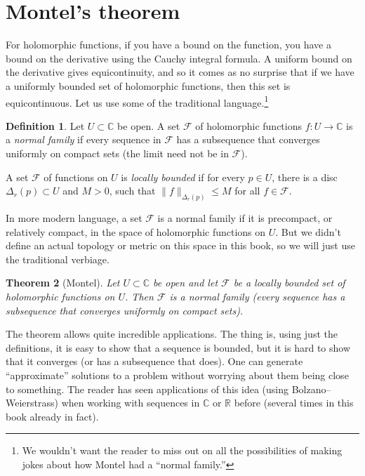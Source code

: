 \documentclass[12pt,openany]{book}
\newcommand{\snorm}[1]{\lVert {#1} \rVert}
\newcommand{\C}{{\mathbb{C}}}
\newcommand{\R}{{\mathbb{R}}}
\newcommand{\sF}{{\mathscr{F}}}
\newcommand{\myindex}[1]{#1\index{#1}}
\newcommand{\myquote}[1]{``#1''}
\theoremstyle{plain}
\newtheorem{thm}{Theorem}[section]
\theoremstyle{remark}
\theoremstyle{definition}
\newtheorem{defn}[thm]{Definition}
\theoremstyle{exercise}
\theoremstyle{example}
\begin{document}

\section{Montel's theorem}
\label{sec:montel}

For holomorphic functions, if you have a bound on the function, you have a
bound on the derivative using the Cauchy integral formula.  A uniform
bound on the derivative gives equicontinuity, and
so it comes as no
surprise that if we have a uniformly bounded set of holomorphic functions,
then this set is equicontinuous.
Let us use some of the traditional language.\footnote{%
We wouldn't want the reader to miss out on all the possibilities of making
jokes about how Montel had a \myquote{normal family.}}

\begin{defn}
Let $U \subset \C$ be open.
A set $\sF$ of holomorphic functions $f \colon U \to \C$ is a
\emph{\myindex{normal family}} if every sequence in $\sF$ has a subsequence
that converges uniformly on compact sets (the limit need not be in $\sF$).

A set $\sF$ of functions on $U$ is \emph{\myindex{locally bounded}}
if for every $p \in U$, there is a disc $\Delta_r(p) \subset U$ and $M > 0$,
such that 
$\snorm{f}_{\Delta_r(p)} \leq M$ for all $f \in \sF$.
\end{defn}

In more modern language, a set $\sF$ is a normal family if it is precompact, or
relatively compact, in the space of holomorphic functions on $U$.  But we
didn't define an actual topology or metric on this space in this book, so
we will just use the traditional verbiage.

\begin{thm}[Montel]
Let $U \subset \C$ be open and let $\sF$
be a locally bounded set of holomorphic functions on $U$.
Then $\sF$ is a normal family (every sequence has a subsequence that
converges uniformly on compact sets).
\end{thm}

The theorem allows quite incredible applications.  The thing is,
using just the definitions, it is easy to show that a sequence is bounded,
but it is hard to show that it converges (or has a subsequence that does).
One can generate \myquote{approximate} solutions to a problem without worrying
about them being close to something.
The reader has seen applications of this idea (using Bolzano--Weierstrass)
when working with sequences in $\C$ or $\R$ before (several times in this
book already in fact).
\end{document}
